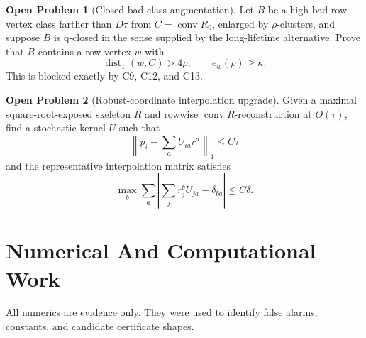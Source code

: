 \documentclass[11pt]{article}
\newcommand{\conv}{\operatorname{conv}}
\newcommand{\dist}{\operatorname{dist}}
\theoremstyle{definition}
\newtheorem{openproblem}{Open Problem}
\begin{document}
\begin{openproblem}[Closed-bad-class augmentation]
Let \(B\) be a high bad row-vertex class farther than \(D\tau\) from
\(C=\conv R_0\), enlarged by \(\rho\)-clusters, and suppose \(B\) is
q-closed in the sense supplied by the long-lifetime alternative.  Prove that
\(B\) contains a row vertex \(w\) with
\[
  \dist_1(w,C)>4\rho,\qquad e_w(\rho)\geq\kappa.
\]
This is blocked exactly by C9, C12, and C13.
\end{openproblem}

\begin{openproblem}[Robust-coordinate interpolation upgrade]
Given a maximal square-root-exposed skeleton \(R\) and rowwise
\(\conv R\)-reconstruction at \(O(\tau)\), find a stochastic kernel \(U\) such
that
\[
  \left\|p_i-\sum_aU_{ia}r^a\right\|_1\leq C\tau
\]
and the representative interpolation matrix satisfies
\[
  \max_b\sum_a\left|\sum_jr^b_jU_{ja}-\delta_{ba}\right|\leq C\delta.
\]
\end{openproblem}

\section{Numerical And Computational Work}

All numerics are evidence only.  They were used to identify false alarms,
constants, and candidate certificate shapes.
\end{document}
